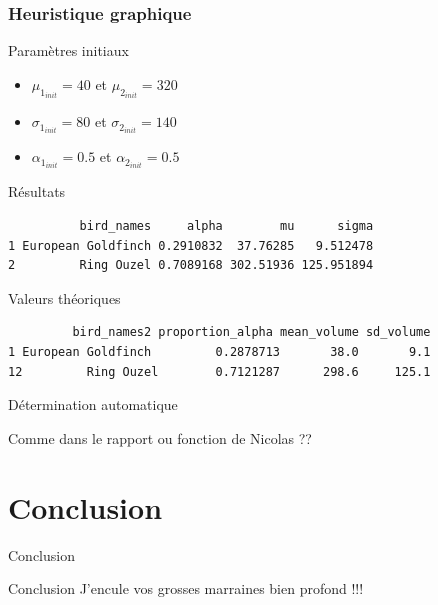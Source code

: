\documentclass[11pt]{beamer}
\begin{document}
	\begin{frame}[fragile]\frametitle{Heuristique graphique}
		\begin{block}{\scriptsize Paramètres initiaux}
			\begin{itemize}
				\scriptsize
				\centering
				\item $\mu_{1_{init}} =  40$ et $\mu_{2_{init}} = 320$
				\item $\sigma_{1_{init}} =  80$ et $\sigma_{2_{init}} = 140$
				\item $\alpha_{1_{init}} = 0.5$ et $\alpha_{2_{init}} = 0.5$
			\end{itemize}
		\end{block}
		\begin{block}{\scriptsize Résultats}
			\scriptsize
			\begin{verbatim}
          bird_names     alpha        mu      sigma
1 European Goldfinch 0.2910832  37.76285   9.512478
2         Ring Ouzel 0.7089168 302.51936 125.951894
			\end{verbatim}
		\end{block}
		\begin{block}{\scriptsize Valeurs théoriques}
			\scriptsize
			\begin{verbatim}
         bird_names2 proportion_alpha mean_volume sd_volume
1 European Goldfinch         0.2878713       38.0       9.1
12         Ring Ouzel        0.7121287      298.6     125.1
			\end{verbatim}
		\end{block}
	\end{frame}


	\begin{frame}{Détermination automatique}
		\begin{block}{}
			Comme dans le rapport ou fonction de Nicolas ??
		\end{block}
	\end{frame}


	\section{Conclusion}

	\begin{frame}{Conclusion}
		\begin{block}{Conclusion}
			J'encule vos grosses marraines bien profond !!!
		\end{block}
	\end{frame}
\end{document}
